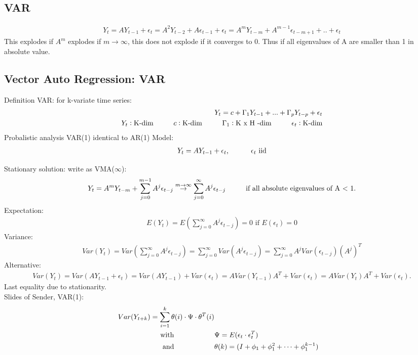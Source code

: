\subsection{VAR}
\begin{align*}
Y_t=A Y_{t-1}+\epsilon_t= A^2 Y_{t-2} + A \epsilon_{t-1} + \epsilon_t = A^m Y_{t-m}+A^{m-1} \epsilon_{t-m+1}+..+\epsilon_t
\end{align*}
This explodes if $A^m$ explodes if $m \rightarrow \infty$, this does not explode if it converges to 0. Thus if all eigenvalues of A are smaller than 1 in absolute value.

\subsection{Vector Auto Regression: VAR}
Definition VAR: for k-variate time series:
\begin{align*}
Y_t=c+ \Gamma_1 Y_{t-1} + ... + \Gamma_p Y_{t-p} + \epsilon_t
\\
Y_t: \text{K-dim} \hspace{10mm} c: \text{K-dim} \hspace{10mm} \Gamma_1: \text{K x H -dim} \hspace{10mm} \epsilon_t: \text{K-dim}
\end{align*}
Probalistic analysis VAR(1) identical to AR(1)
Model:
\begin{align*}
Y_t=A Y_{t-1}+\epsilon_t \text{, } \hspace{10mm} \epsilon_t  \text{ iid}
\end{align*}

Stationary solution: write as VMA($\infty$):
\begin{align*}
Y_t = A^m Y_{t-m}+ \sum_{j=0}^{m-1} A^{j} \epsilon_{t-j} \overset{m \to \infty}{\to} \sum_{j=0}^{\infty} A^{j} \epsilon_{t-j} \hspace{10mm} \text{if all absolute eigenvalues of A $<$ 1.}
\end{align*}
Expectation: 
\begin{align*}
E(Y_t) = E(\sum_{j=0}^{\infty} A^{j} \epsilon_{t-j}) = 0 \text{ if } E(\epsilon_t)=0
\end{align*}
Variance:
\begin{align*}
Var(Y_t)=Var(\sum_{j=0}^{\infty} A^{j} \epsilon_{t-j})=\sum_{j=0}^{\infty} Var(A^{j}
\epsilon_{t-j})=\sum_{j=0}^{\infty} A^{j} Var(\epsilon_{t-j}) (A^{j})^T 
\end{align*}
Alternative:
\begin{align*}
Var(Y_t)= Var(A Y_{t-1} + \epsilon_t) = Var(A Y_{t-1}) + Var(\epsilon_t) = A Var(Y_{t-1}) A^T + Var(\epsilon_t) = A Var(Y_t) A^T + Var(\epsilon_t).
\end{align*}
Last equality due to stationarity. \\
Slides of Sender, VAR(1):
\begin{align*}
Var(Y_{t+k})=\sum_{i=1}^{k} \theta(i)\cdot\Psi\cdot\theta^T(i) \\
\text{with} \hspace{20mm} &\Psi=E(\epsilon_t\cdot\epsilon_t^T) \\
\text{and} \hspace{20mm} &\theta(k)=(I+\phi_1+\phi_1^2+\dots+\phi_1^{k-1})
\end{align*}

